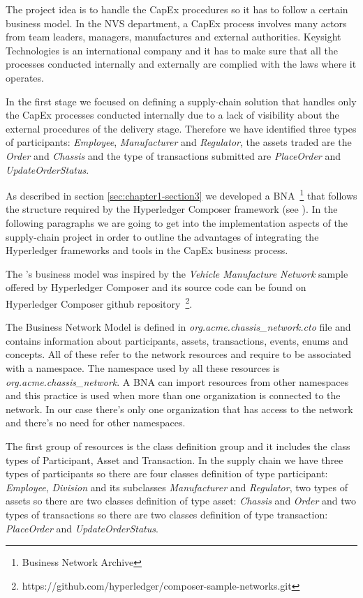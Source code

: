 The project idea is to handle the CapEx procedures so it has to follow a certain business model. In the NVS department, a CapEx process involves many actors from team leaders, managers, manufactures and external authorities. 
Keysight Technologies is an international company and it has to make sure that all the processes conducted internally and externally are complied with the laws where it operates.

In the first stage we focused on defining a supply-chain solution that handles only the CapEx processes conducted internally due to a lack of visibility about the external procedures of the delivery stage. 
Therefore we have identified three types of participants: \emph{Employee}, \emph{Manufacturer} and \emph{Regulator}, the assets traded are the \emph{Order} and \emph{Chassis} and the type of transactions submitted are \emph{PlaceOrder} and \emph{UpdateOrderStatus}.

As described in section \ref{sec:chapter1-section3} we developed a BNA~\footnote{Business Network Archive} that follows the structure required by the Hyperledger Composer framework (see ). In the following paragraphs we are going to get into the implementation aspects of the supply-chain project in order to outline the advantages of integrating the Hyperledger frameworks and tools in the CapEx business process. 

The {\project}'s business model was inspired by the \emph{Vehicle Manufacture Network} sample offered by Hyperledger Composer and its source code can be found on Hyperledger Composer github repository~\footnote{ https://github.com/hyperledger/composer-sample-networks.git}.


The Business Network Model is defined in \emph{org.acme.chassis_network.cto} file and contains information about participants, assets, transactions, events, enums and concepts. All of these refer to the network resources and require to be associated with a namespace. The namespace used by all these resources is \emph{org.acme.chassis_network}. A BNA can import resources from other namespaces and this practice is used when more than one organization is connected to the network. In our case there's only one organization that has access to the network and there's no need for other namespaces.

The first group of resources is the class definition group and it includes the class types of Participant, Asset and Transaction. In the supply chain we have three types of participants so there are four classes definition of type participant: \emph{Employee}, \emph{Division} and its subclasses \emph{Manufacturer} and \emph{Regulator}, two types of assets so there are two classes definition of type asset: \emph{Chassis} and \emph{Order} and two types of transactions so there are two classes definition of type transaction: \emph{PlaceOrder} and \emph{UpdateOrderStatus}. 

